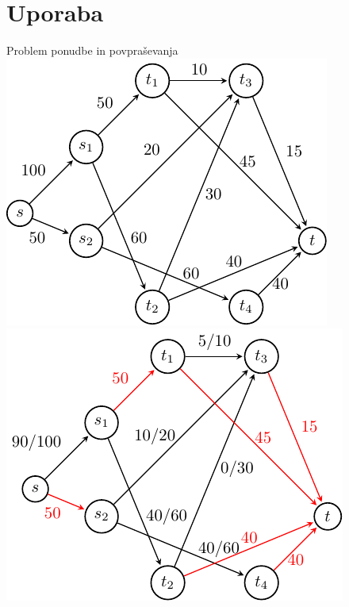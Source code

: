 \documentclass{beamer}
\begin{document}
\section{Uporaba}
\begin{frame}{Problem ponudbe in povpraševanja}
    \centering\pause
    \includegraphics[scale=0.7]{../writing/images/primer1-1.pdf}~~~\pause
    \includegraphics[scale=0.7]{../writing/images/primer1-3.pdf}
\end{frame}
\end{document}
